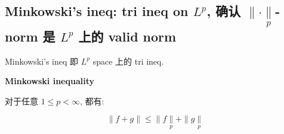 \documentclass{qlnotes-export}
\begin{document}
\subsection{\texorpdfstring{Minkowski's ineq: tri ineq on \(L^{p}\), 确认 \(\parallel \cdot \underset{p}{\parallel}\)-norm 是 \(L^{p}\) 上的 valid norm}{Minkowski's ineq: tri ineq on L\^{}\{p\}, 确认 \textbackslash parallel \textbackslash cdot \textbackslash underset\{p\}\{\textbackslash parallel\}-norm 是 L\^{}\{p\} 上的 valid norm}}\label{minkowskis-ineq-tri-ineq-on-lp-ux786eux8ba4-parallel-cdot-undersetpparallel-norm-ux662f-lp-ux4e0aux7684-valid-norm}

Minkowski's ineq 即 \(L^{p}\) space 上的 tri ineq.

\begin{corollary}{\protect{}\label{kn-minkowski-inequality}{\textbf{Minkowski
inequality}}}

对于任意 \(1 \leq p < \infty\), 都有:

\[\parallel f + g \parallel \leq \parallel f\underset{p}{\parallel} + \parallel g\underset{p}{\parallel}\]

\end{corollary}
\end{document}
